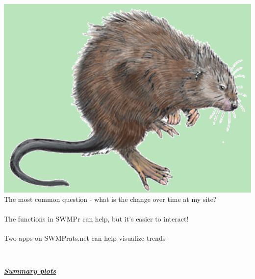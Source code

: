 \documentclass[serif]{beamer}\usepackage[]{graphicx}\usepackage[]{color}
\newcommand{\Bigtxt}[1]{\textbf{\textit{#1}}}
\begin{document}
\begin{frame}[fragile]{\includegraphics[width=0.05\paperwidth]{fig/muskrat.png}\hspace{0.07in}{\bf SWMPrats.net: Widgets}}
The most common question - what is the change over time at my site? \\~\\
The functions in SWMPr can help, but it's easier to interact!\\~\\
Two apps on SWMPrats.net can help visualize trends \\~\\
\begin{columns}[t]
\begin{column}{0.45\textwidth}
\centerline{\Bigtxt{\href{https://beckmw.shinyapps.io/swmp_summary}{Summary plots}}}
\centerline{}

\end{column}
\end{columns}
\end{frame}
\end{document}
